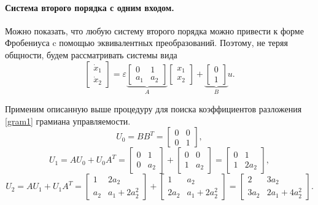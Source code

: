 \documentclass[../main.tex]{subfiles}
\begin{document}
\paragraph{Система второго порядка с одним входом.}
Можно показать, что любую систему второго порядка можно привести к форме Фробениуса c помощью эквивалентных преобразований. Поэтому, не теряя общности, будем рассматривать системы вида
\begin{equation}\label{system32}
	\left[ {\begin{array}{*{20}{c}}
			{{{\dot x}_1}}\\
			{{{\dot x}_2}}
	\end{array}} \right] = \varepsilon \underbrace {\left[ {\begin{array}{*{20}{c}}
				0&1\\
				a_1&a_2
		\end{array}} \right]}_A\left[ {\begin{array}{*{20}{c}}
			{{x_1}}\\
			{{x_2}}
	\end{array}} \right] + \underbrace {\left[ {\begin{array}{*{20}{c}}
				0\\
				1
		\end{array}} \right]}_Bu.
\end{equation}

Применим описанную выше процедуру для поиска коэффициентов разложения \eqref{gram1} грамиана управляемости.
\begin{equation*}
	U_0 = B B^T =  \left[ {\begin{array}{*{20}{c}}
			0&0\\
			0&1
	\end{array}}\right],
\end{equation*}
\begin{equation*}
	U_1 = A U_0 + U_0 A^T = \left[ {\begin{array}{*{20}{c}}
			0&1\\
			0&a_2
	\end{array}}\right] + \left[ {\begin{array}{*{20}{c}}
			0&0\\
			1&a_2
	\end{array}}\right] = \left[ {\begin{array}{*{20}{c}}
			0&1\\
			1&2 a_2
	\end{array}}\right],
\end{equation*}
\begin{equation*}
	U_2 = A U_1 + U_1 A^T = \left[ {\begin{array}{*{20}{c}}
			1&2a_2\\
			a_2&a_1+2a_2^2
	\end{array}}\right] + \left[ {\begin{array}{*{20}{c}}
			1&a_2\\
			2a_2&a_1+2a_2^2
	\end{array}}\right] = \left[ {\begin{array}{*{20}{c}}
			2&3a_2\\
			3a_2&2a_1+4a_2^2
	\end{array}}\right].
\end{equation*}
\end{document}
